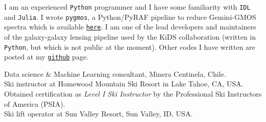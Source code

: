 \documentclass[11pt]{article}
\begin{document}
\pagebreak



\noindent
I am an experienced \texttt{Python} programmer and I have some familiarity with
\texttt{IDL} and \texttt{Julia}. I wrote {\tt pygmos}, a Python/PyRAF pipeline to reduce 
Gemini-GMOS spectra which is available 
\href{https://github.com/cristobal-sifon/pygmos/}{\texttt{here}}. 
I am one of the lead 
developers and maintainers of the galaxy-galaxy lensing pipeline used by the 
KiDS collaboration (written in \texttt{Python}, but which is not public at the 
moment). Other codes I have written are posted at my 
\href{https://github.com/cristobal-sifon}{\texttt{github}} page.\\


\hline



\noindent
{} Data science \& Machine Learning consultant, Minera Centinela, Chile.\\
 Ski instructor at Homewood Mountain Ski Resort in Lake 
Tahoe, CA, USA. Obtained certification as \emph{Level I Ski Instructor} by the 
Professional Ski Instructors of America (PSIA).\\
 Ski lift operator at Sun Valley Resort, Sun Valley, ID, USA.\\


\end{document}
